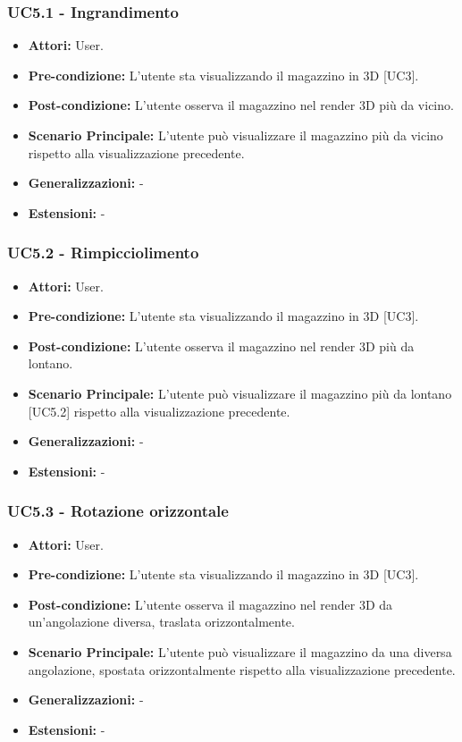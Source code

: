 \subsubsection{UC5.1 - Ingrandimento}
\begin{itemize}
    \item \textbf{Attori:} User.
    \item \textbf{Pre-condizione:}  L'utente sta visualizzando il magazzino in 3D [UC3].
    \item \textbf{Post-condizione:} L'utente osserva il magazzino nel render 3D più da vicino.
    \item \textbf{Scenario Principale:}  L'utente può visualizzare il magazzino più da vicino rispetto alla visualizzazione precedente.
    \item \textbf{Generalizzazioni:} -
    \item \textbf{Estensioni:} -
\end{itemize}


\subsubsection{UC5.2 - Rimpicciolimento}
\begin{itemize}
    \item \textbf{Attori:} User.
    \item \textbf{Pre-condizione:}  L'utente sta visualizzando il magazzino in 3D [UC3].
    \item \textbf{Post-condizione:} L'utente osserva il magazzino nel render 3D più da lontano.
    \item \textbf{Scenario Principale:}  L'utente può visualizzare il magazzino più da lontano [UC5.2] rispetto alla visualizzazione precedente.
    \item \textbf{Generalizzazioni:} -
    \item \textbf{Estensioni:} -
\end{itemize}


\subsubsection{UC5.3 - Rotazione orizzontale}
\begin{itemize}
    \item \textbf{Attori:} User.
    \item \textbf{Pre-condizione:}  L'utente sta visualizzando il magazzino in 3D [UC3].
    \item \textbf{Post-condizione:} L'utente osserva il magazzino nel render 3D da un'angolazione diversa, traslata orizzontalmente.
    \item \textbf{Scenario Principale:}  L'utente può visualizzare il magazzino da una diversa angolazione, spostata orizzontalmente rispetto alla visualizzazione precedente.
    \item \textbf{Generalizzazioni:} -
    \item \textbf{Estensioni:} -
\end{itemize}


